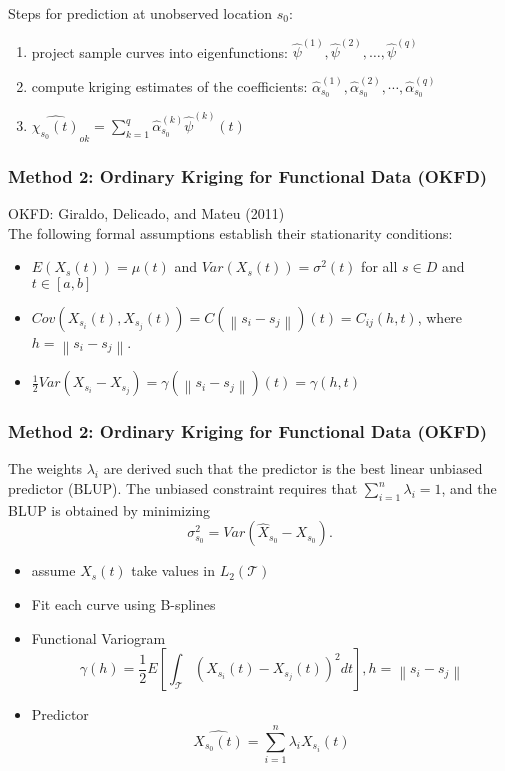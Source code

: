 \documentclass{beamer}
\newcommand{\T}{\mathcal{T}}
\newcommand{\norm}[1]{\left\|#1\right\|}
\begin{document}
\frame
{
Steps for prediction at unobserved location $s_0$:
\begin{enumerate}
\item project sample curves into eigenfunctions: $\hat{\psi}^{(1)}, \hat{\psi}^{(2)}, \dots, \hat{\psi}^{(q)}$
\item compute kriging estimates of the coefficients: $\hat{\alpha}_{s_0}^{(1)}, \hat{\alpha}_{s_0}^{(2)}, \cdots, \hat{\alpha}_{s_0}^{(q)}$
\item $\widehat{\chi_{s_0}(t)}_{ok} = \sum_{k=1}^{q} \hat{\alpha}_{s_0}^{(k)}\hat{\psi}^{(k)}(t)$
\end{enumerate}
}

\frame
{
\frametitle{Method 2: Ordinary Kriging for Functional Data (OKFD)}

OKFD: Giraldo, Delicado, and Mateu (2011)\\[.5cm]

The following formal assumptions establish their stationarity conditions:
\begin{itemize}
	\item $E(X_s(t)) = \mu(t)$ and $Var(X_s(t)) = \sigma^2(t)$ for all $s \in D$ and $t \in [a,b]$
	\item $Cov(X_{s_i}(t), X_{s_j}(t)) = C(\norm{s_i - s_j})(t) = C_{ij}(h,t)$, where $h = \norm{s_i - s_j}$.
	\item $\frac{1}{2}Var(X_{s_i} - X_{s_j}) = \gamma(\norm{s_i - s_j})(t) = \gamma(h,t)$
\end{itemize}
}

\frame
{
\frametitle{Method 2: Ordinary Kriging for Functional Data (OKFD)}
The weights $\lambda_i$ are derived such that the predictor is the best linear unbiased predictor (BLUP). The unbiased constraint requires that $\sum_{i=1}^n\lambda_i = 1$, and the BLUP is obtained by minimizing
\begin{equation}
	\sigma^2_{s_0} = Var(\hat{X}_{s_0} - X_{s_0}).
\end{equation}
\begin{itemize}
\item assume $X_s(t)$ take values in $L_2(\T)$
\item Fit each curve using B-splines
\item Functional Variogram \[ \gamma(h) = \frac{1}{2}E\left[ \int_{\T}(X_{s_i}(t) - X_{s_j}(t))^2 dt \right] , h = \norm{s_i - s_j}\]
\item Predictor \[
\widehat{X_{s_0}(t)} = \sum_{i=1}^n \lambda_i X_{s_i}(t)
\]
\end{itemize}
}
\end{document}

